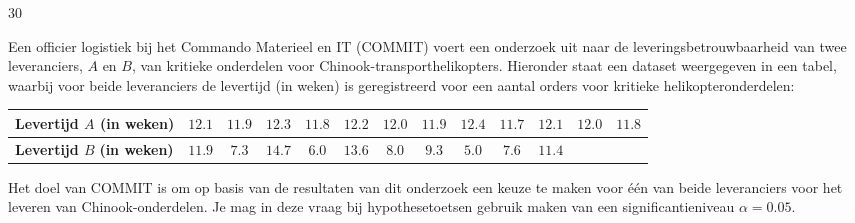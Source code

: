\begin{question}{30}{
    Een officier logistiek bij het Commando Materieel en IT (COMMIT) voert een onderzoek uit naar de leveringsbetrouwbaarheid 
    van twee leveranciers, $A$ en $B$, van kritieke onderdelen voor Chinook-transporthelikopters.
    Hieronder staat een dataset weergegeven in een tabel, waarbij voor beide leveranciers de levertijd (in weken) is geregistreerd voor een aantal orders voor kritieke helikopteronderdelen:     
    \begin{center}
        \begin{tabular}{m{2.7cm}|cccccccccccc}
            \toprule
                \textbf{Levertijd $A$} \newline \textbf{(in weken)} & $12.1$ & $11.9$ & $12.3$ & $11.8$ & $12.2$ & $12.0$ & $11.9$ & $12.4$ & $11.7$ & $12.1$ & $12.0$ & $11.8$\\
            \midrule
                \textbf{Levertijd $B$} \newline \textbf{(in weken)} & $11.9$ & $7.3$ & $14.7$ & $6.0$ & $13.6$ & $8.0$ & $9.3$ & $5.0$ & $7.6$ & $11.4$ & & \\
            \bottomrule
        \end{tabular}
    \end{center}
    Het doel van COMMIT is om op basis van de resultaten van dit onderzoek een keuze te maken voor één van beide leveranciers voor het leveren van Chinook-onderdelen.
    Je mag in deze vraag bij hypothesetoetsen gebruik maken van een significantieniveau $\alpha = 0.05$.
}

\end{question}
